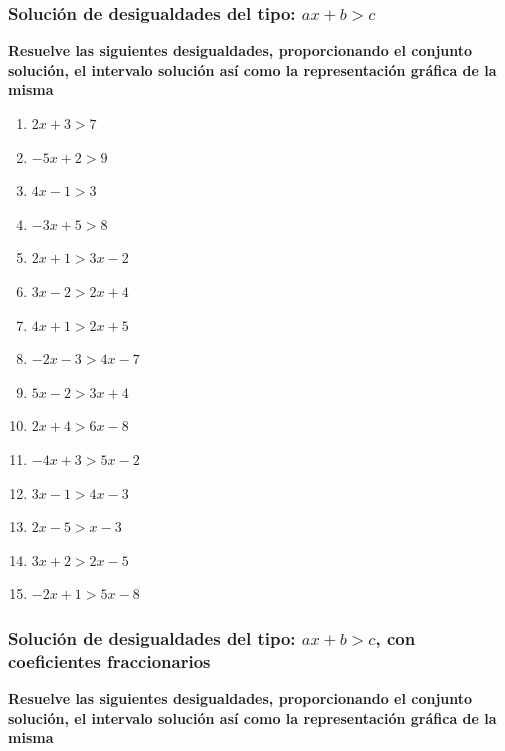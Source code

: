 \documentclass[12pt]{article}
\theoremstyle{plain}
\theoremstyle{definition}
\theoremstyle{remark}
\begin{document}
\subsubsection{Solución de desigualdades del tipo: \(ax+b>c\)}

\textbf{Resuelve las siguientes desigualdades, proporcionando el conjunto solución, el intervalo solución así como la representación gráfica de la misma}

\begin{enumerate}
\def\labelenumi{\arabic{enumi}.}
\item
  \(2x+3>7\)
\item
  \(-5x+2>9\)
\item
  \(4x-1>3\)
\item
  \(-3x+5>8\)
\item
  \(2x+1>3x-2\)
\item
  \(3x-2>2x+4\)
\item
  \(4x+1>2x+5\)
\item
  \(-2x-3>4x-7\)
\item
  \(5x-2>3x+4\)
\item
  \(2x+4>6x-8\)
\item
  \(-4x+3>5x-2\)
\item
  \(3x-1>4x-3\)
\item
  \(2x-5>x-3\)
\item
  \(3x+2>2x-5\)
\item
  \(-2x+1>5x-8\)
\end{enumerate}

\subsubsection{Solución de desigualdades del tipo: \(ax+b>c\), con coeficientes fraccionarios}

\textbf{Resuelve las siguientes desigualdades, proporcionando el conjunto solución, el intervalo solución así como la representación gráfica de la misma}
\end{document}
